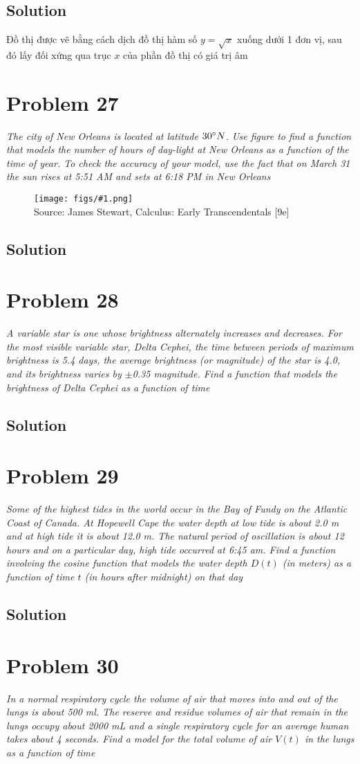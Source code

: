 \documentclass[11pt]{article}
\newcommand{\soln}{\subsection*}
\newcommand{\qn}{\textit}
\newcommand{\imagesource}[1]{{\footnotesize Source: #1}}
\newcommand{\imgqn}[1]{
	\begin{figure}[H]
		\centering
		\texttt{[image: figs/\#1.png]}\\
		\imagesource{James Stewart, Calculus: Early Transcendentals [9e]}
	\end{figure}
}
\begin{document}
\soln{Solution}
Đồ thị được vẽ bằng cách dịch đồ thị hàm số $y=\sqrt{x}$ xuống dưới 1 đơn vị, sau đó lấy đối xứng qua trục $x$ của phần đồ thị có giá trị âm

\section*{Problem 27}

\qn{The city of New Orleans is located at latitude $30\degree N$. Use figure to find a function that models the number of hours of day-light at New Orleans as a function of the time of year. To check the accuracy of your model, use the fact that on March 31 the sun rises at 5:51 AM and sets at 6:18 PM in New Orleans}
\imgqn{1.3.27}

\soln{Solution}

\section*{Problem 28}

\qn{A variable star is one whose brightness alternately increases and decreases. For the most visible variable star, Delta Cephei, the time between periods of maximum brightness is 5.4 days, the average brightness (or magnitude) of the star is 4.0, and its brightness varies by $\pm$0.35 magnitude. Find a function that models the brightness of Delta Cephei as a function of time}

\soln{Solution}

\section*{Problem 29}

\qn{Some of the highest tides in the world occur in the Bay of Fundy on the Atlantic Coast of Canada. At Hopewell Cape the water depth at low tide is about 2.0 m and at high tide it is about 12.0 m. The natural period of oscillation is about 12 hours and on a particular day, high tide occurred at 6:45 am. Find a function involving the cosine function that models the water depth $D(t)$ (in meters) as a function of time $t$ (in hours after midnight) on that day}

\soln{Solution}

\section*{Problem 30}

\qn{In a normal respiratory cycle the volume of air that moves into and out of the lungs is about 500 ml. The reserve and residue volumes of air that remain in the lungs occupy about 2000 mL and a single respiratory cycle for an average human takes about 4 seconds. Find a model for the total volume of air $V(t)$ in the lungs as a function of time}
\end{document}
